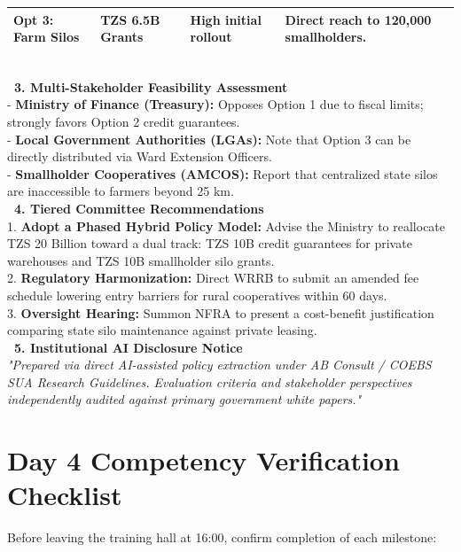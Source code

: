 \documentclass[11pt, a4paper]{report}
\begin{document}
\begin{tcolorbox}[colback=lightgrey, colframe=bordergrey, title=\textbf{Deliverable 4 Preview: \texttt{Day4\_Strategic\_Policy\_Options.md}}]
\begin{tabular}{p{2.2cm}p{2.6cm}p{3.2cm}p{3.8cm}}
Opt 3: Farm Silos & TZS 6.5B Grants & High initial rollout & Direct reach to 120,000 smallholders. \\
\bottomrule
\end{tabular}\\[0.2cm]
\textcolor{tanzaniablue}{\textbf{\ 3. Multi-Stakeholder Feasibility Assessment}}\\
- \textbf{Ministry of Finance (Treasury):} Opposes Option 1 due to fiscal limits; strongly favors Option 2 credit guarantees.\\
- \textbf{Local Government Authorities (LGAs):} Note that Option 3 can be directly distributed via Ward Extension Officers.\\
- \textbf{Smallholder Cooperatives (AMCOS):} Report that centralized state silos are inaccessible to farmers beyond 25 km.\\[0.2cm]
\textcolor{tanzaniablue}{\textbf{\ 4. Tiered Committee Recommendations}}\\
1. \textbf{Adopt a Phased Hybrid Policy Model:} Advise the Ministry to reallocate TZS 20 Billion toward a dual track: TZS 10B credit guarantees for private warehouses and TZS 10B smallholder silo grants.\\
2. \textbf{Regulatory Harmonization:} Direct WRRB to submit an amended fee schedule lowering entry barriers for rural cooperatives within 60 days.\\
3. \textbf{Oversight Hearing:} Summon NFRA to present a cost-benefit justification comparing state silo maintenance against private leasing.\\[0.2cm]
\textcolor{tanzaniablue}{\textbf{\ 5. Institutional AI Disclosure Notice}}\\
\textit{"Prepared via direct AI-assisted policy extraction under AB Consult / COEBS SUA Research Guidelines. Evaluation criteria and stakeholder perspectives independently audited against primary government white papers."}
\end{tcolorbox}

\section{Day 4 Competency Verification Checklist}
Before leaving the training hall at 16:00, confirm completion of each milestone:
\end{document}
